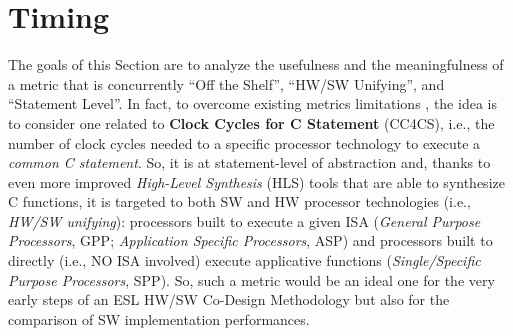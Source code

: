 \section{Timing}\label{timing_metric_def}
%
The goals of this Section are to analyze the usefulness and the meaningfulness of a metric that is concurrently “Off the Shelf”, “HW/SW Unifying”, and “Statement Level”. In fact, to overcome existing metrics limitations \cite{bib25}, the idea is to consider one related to \textbf{Clock Cycles for C Statement} (CC4CS), i.e., the number of clock cycles needed to a specific processor technology to execute a \textit{common C statement}. So, it is at statement-level of abstraction and, thanks to even more improved \textit{High-Level Synthesis} (HLS) tools that are able to synthesize C functions, it is targeted to both SW and HW processor technologies (i.e., \textit{HW/SW unifying}): processors built to execute a given ISA (\textit{General Purpose Processors}, GPP; \textit{Application Specific Processors}, ASP) and processors built to directly (i.e., NO ISA involved) execute applicative functions (\textit{Single/Specific Purpose Processors}, SPP). So, such a metric would be an ideal one for the very early steps of an ESL HW/SW Co-Design Methodology but also for the comparison of SW implementation performances. 
%
